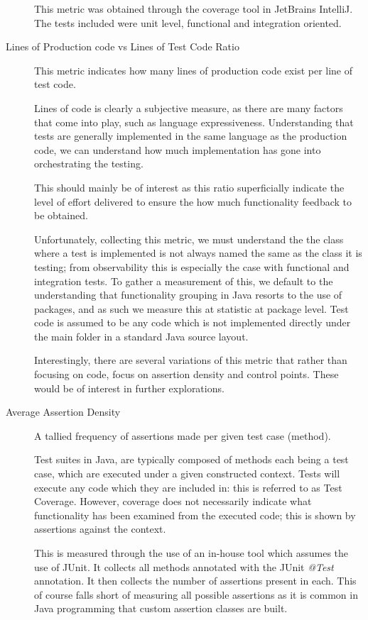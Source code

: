 \begin{description}
	This metric was obtained through the coverage tool in JetBrains IntelliJ. The tests included were unit level, functional and integration oriented. 
		
	\item [Lines of Production code vs Lines of Test Code Ratio] This metric indicates how many lines of production code exist per line of test code. 
	
	Lines of code is clearly a subjective measure, as there are many factors that come into play, such as language expressiveness. Understanding that tests are generally implemented in the same language as the production code, we can understand how much implementation has gone into orchestrating the testing. 
	
	This should mainly be of interest as this ratio superficially indicate the level of effort delivered to ensure the how much functionality feedback to be obtained. 
	
	Unfortunately, collecting this metric, we must understand the the class where a test is implemented is not always named the same as the class it is testing; from observability this is especially the case with functional and integration tests. To gather a measurement of this, we default to the understanding that functionality grouping in Java resorts to the use of packages, and as such we measure this at statistic at package level. Test code is assumed to be any code which is not implemented directly under the main folder in a standard Java source layout. 
	
	Interestingly, there are several variations of this metric that rather than focusing on code, focus on assertion density and control points. These would be of interest in further explorations.
	
	\item [Average Assertion Density] A tallied frequency of assertions made per given test case (method).
	
	Test suites in Java, are typically composed of methods each being a test case, which are executed under a given constructed context. Tests will execute any code which they are included in: this is referred to as Test Coverage. However, coverage does not necessarily indicate what functionality has been examined from the executed code; this is shown by assertions against the context.
	
	This is measured through the use of an in-house tool which assumes the use of JUnit. It collects all methods annotated with the JUnit \textit{@Test} annotation. It then collects the number of assertions present in each. This of course falls short of measuring all possible assertions as it is common in Java programming that custom assertion classes are built. 
	

\end{description}
